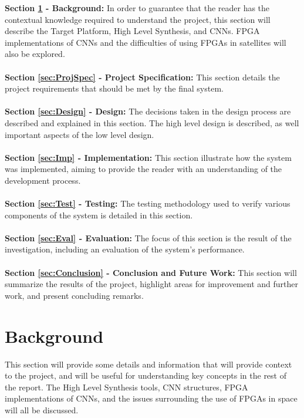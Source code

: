 \documentclass[12pt]{article}
\begin{document}
\textbf{Section \ref{sec:Background} - Background:} In order to guarantee that the reader has the contextual knowledge required to understand the project, this section will describe the Target Platform, High Level Synthesis, and CNNs. FPGA implementations of CNNs and the difficulties of using FPGAs in satellites will also be explored.\\
\\
\textbf{Section \ref{sec:ProjSpec} - Project Specification:} This section details the project requirements that should be met by the final system.\\
\\
\textbf{Section \ref{sec:Design} - Design:} The decisions taken in the design process are described and explained in this section. The high level design is described, as well important aspects of the low level design.\\
\\
\textbf{Section \ref{sec:Imp} - Implementation:} This section illustrate how the system was implemented, aiming to provide the reader with an understanding of the development process.\\
\\
\textbf{Section \ref{sec:Test} - Testing:} The testing methodology used to verify various components of the system is detailed in this section.\\
\\
\textbf{Section \ref{sec:Eval} - Evaluation:} The focus of this section is the result of the investigation, including an evaluation of the system's performance.\\
\\
\textbf{Section \ref{sec:Conclusion} - Conclusion and Future Work:} This section will summarize the results of the project, highlight areas for improvement and further work, and present concluding remarks.\\

\newpage

\section{Background}
\label{sec:Background}
\vspace{-12pt}

This section will provide some details and information that will provide context to the project, and will be useful for understanding key concepts in the rest of the report. The High Level Synthesis tools, CNN structures, FPGA implementations of CNNs, and the issues surrounding the use of FPGAs in space will all be discussed.
\end{document}
